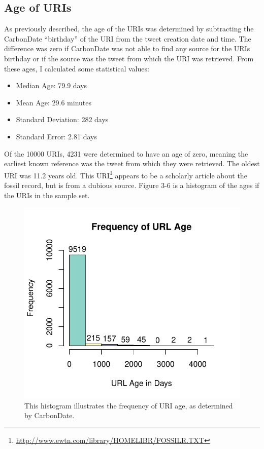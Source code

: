 \documentclass[a4paper,12pt]{article}
\begin{document}
\subsection{Age of URIs}
As previously described, the age of the URIs was determined by subtracting the CarbonDate
``birthday'' of the URI from the tweet creation date and time. The difference was zero if
CarbonDate was not able to find any source for the URIs birthday or if the source was the
tweet from which the URI was retrieved. From these ages, I calculated some statistical values:
\begin{itemize}
    \item Median Age: 79.9 days
    \item Mean Age: 29.6 minutes
    \item Standard Deviation: 282 days
    \item Standard Error: 2.81 days
\end{itemize}
Of the 10000 URIs, 4231 were determined to have an age of zero, meaning the earliest known
reference was the tweet from which they were retrieved. The oldest URI was 11.2 years old.
This URI\footnote{\url{http://www.ewtn.com/library/HOMELIBR/FOSSILR.TXT}} appears to be a
scholarly article about the fossil record, but is from a dubious source. Figure 3-6 is a
histogram of the ages if the URIs in the sample set.
\begin{figure}[H]
    \centering
    \includegraphics{stats/time_deltas.pdf}
    \caption{This histogram illustrates the frequency of URI age, as determined by CarbonDate.}
\end{figure}
\end{document}
